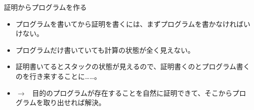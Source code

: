 \documentclass[cjk, 14pt, dvipdfm]{beamer}
\begin{document}
\begin{frame}{証明からプログラムを作る}

  \begin{itemize}
    \item プログラムを書いてから証明を書くには、まずプログラムを書かなければいけない。
    \item プログラムだけ書いていても計算の状態が全く見えない。
    \item 証明書いてるとスタックの状態が見えるので、証明書くのとプログラム書くのを行き来することに……。
    \item $\rightarrow$ \, 目的のプログラムが存在することを自然に証明できて、そこからプログラムを取り出せれば解決。
  \end{itemize}

\end{frame}

\begin{frame}{}

\end{frame}
\end{document}
